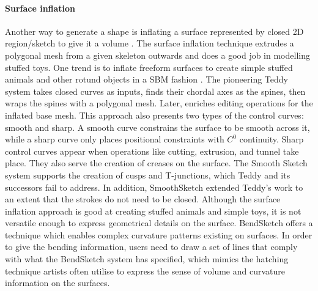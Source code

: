 \documentclass[runningheads]{llncs}
\begin{document}
\paragraph{Surface inflation} Another way to generate a shape is inflating a surface represented by closed 2D region/sketch to give it a volume \cite{kazmi2014survey}. The surface inflation technique extrudes a polygonal mesh from a given skeleton outwards and does a good job in modelling stuffed toys. One trend is to inflate freeform surfaces to create simple stuffed animals and other rotund objects in a SBM fashion \cite{igarashi2005rigid,nealen2007fibermesh,Karpenko:2006:SFS:1141911.1141928}. The pioneering Teddy system \cite{igarashi2005rigid} takes closed curves as inputs, finds their chordal axes as the spines, then wraps the spines with a polygonal mesh. Later, \cite{nealen2007fibermesh} enriches editing operations for the inflated base mesh. This approach also presents two types of the control curves: smooth and sharp. A smooth curve constrains the surface to be smooth across it, while a sharp curve only places positional constraints with $C^{0}$ continuity. Sharp control curves appear when operations like cutting, extrusion, and tunnel take place. They also serve the creation of creases on the surface. The Smooth Sketch system \cite{Karpenko:2006:SFS:1141911.1141928} supports the creation of cusps and T-junctions, which Teddy and its successors fail to address. In addition, SmoothSketch \cite{Karpenko:2006:SFS:1141911.1141928} extended Teddy’s work \cite{igarashi2005rigid} to an extent that the strokes do not need to be closed. Although the surface inflation approach is good at creating stuffed animals and simple toys, it is not versatile enough to express geometrical details on the surface. BendSketch \cite{li2017bendsketch} offers a technique which enables complex curvature patterns existing on surfaces. In order to give the bending information, users need to draw a set of lines that comply with what the BendSketch system \cite{li2017bendsketch} has specified, which mimics the hatching technique artists often utilise to express the sense of volume and curvature information on the surfaces.
\end{document}
